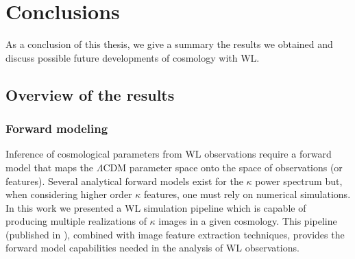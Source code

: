 
\chapter{Conclusions}
 \thispagestyle{plain}
\setlength{\parindent}{10mm}
\label{chp:8}


As a conclusion of this thesis, we give a summary the results we obtained and discuss possible future developments of cosmology with WL. 

\section{Overview of the results}

\subsection{Forward modeling}
Inference of cosmological parameters from WL observations require a forward model that maps the $\Lambda$CDM parameter space onto the space of observations (or features). Several analytical forward models exist for the $\kappa$ power spectrum \citep{Nicaea,Coyote2} but, when considering higher order $\kappa$ features, one must rely on numerical simulations. In this work we presented a WL simulation pipeline which is capable of producing multiple realizations of $\kappa$ images in a given cosmology. This pipeline (published in \citep{lenstools}), combined with image feature extraction techniques, provides the forward model capabilities needed in the analysis of WL observations. 

